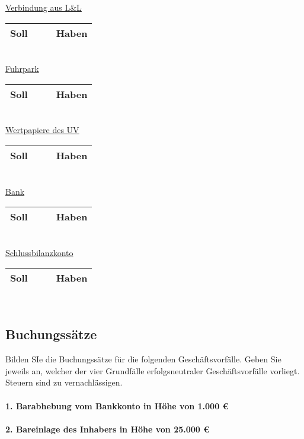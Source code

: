 \documentclass[paper=a4, fontsize=11pt]{scrartcl}
\numberwithin{equation}{section}
\numberwithin{figure}{section}
\numberwithin{table}{section}
\begin{document}
\underline{Verbindung aus L&L}

\begin{tabular}{cc|cc}
\hline
Soll & & & Haben \\
\hline
\end{tabular}
\\

\underline{Fuhrpark}

\begin{tabular}{cc|cc}
\hline
Soll & & & Haben \\
\hline
\end{tabular}
\\

\underline{Wertpapiere des UV}

\begin{tabular}{cc|cc}
\hline
Soll & & & Haben \\
\hline
\end{tabular}
\\

\underline{Bank}

\begin{tabular}{cc|cc}
\hline
Soll & & & Haben \\
\hline
\end{tabular}
\\

\underline{Schlussbilanzkonto}

\begin{tabular}{cc|cc}
\hline
Soll & & & Haben \\
\hline
\end{tabular}
\\


\subsection{Buchungssätze}

Bilden SIe die Buchungssätze für die folgenden Geschäftsvorfälle. Geben Sie jeweils an, welcher der vier Grundfälle erfolgsneutraler Geschäftsvorfälle vorliegt. Steuern sind zu vernachlässigen. \\

\paragraph{1. Barabhebung vom Bankkonto in Höhe von 1.000 €}

\paragraph{2. Bareinlage des Inhabers in Höhe von 25.000 €}
\end{document}
